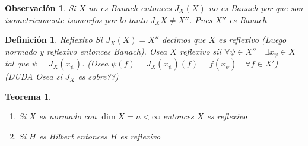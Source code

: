 \documentclass[10pt]{extarticle}
\theoremstyle{break}
\newtheorem{theorem}{Teorema}[section]
\newtheorem*{remark}{Observación}
\newtheorem{definition}{Definición}[section]
\theoremstyle{definition}
\begin{document}
\begin{remark}
Si $X$ no es Banach entonces $J_{X}(X)$ no es Banach por que son isometricamente isomorfos por lo tanto $J_{X}X\neq X''$. Pues $X''$ es Banach
\end{remark}



\begin{definition} Reflexivo
Si $J_{X}(X)=X''$ decimos que $X$ es reflexivo (Luego normado y reflexivo entonces Banach).
Osea $X$ reflexivo sii $\forall \psi\in X''\quad\exists x_{\psi}\in X$ tal que $\psi = J_{X}(x_{\psi})$. (Osea $\psi (f)=J_{X}(x_{\psi})(f)=f(x_{\psi})\quad\forall f\in X'$)
(DUDA Osea si $J_{X}$ es sobre??)
\end{definition}



\begin{theorem}
\begin{enumerate}
\item
Si $X$ es normado con $\dim X=n<\infty$ entonces $X$ es reflexivo
\item
Si $H$ es Hilbert entonces $H$ es reflexivo
\end{enumerate}
\end{theorem}
\end{document}
